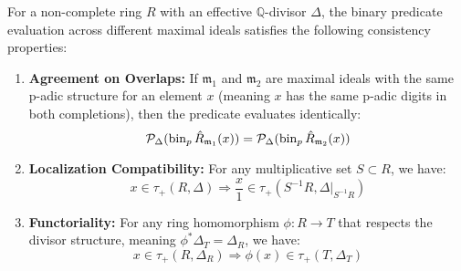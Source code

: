 \begin{theorem}\label{thm:predicate-consistency}
For a non-complete ring $R$ with an effective $\mathbb{Q}$-divisor $\Delta$, the binary predicate evaluation across different maximal ideals satisfies the following consistency properties:

\begin{enumerate}
    \item \textbf{Agreement on Overlaps:} If $\mathfrak{m}_1$ and $\mathfrak{m}_2$ are maximal ideals with the same p-adic structure for an element $x$ (meaning $x$ has the same p-adic digits in both completions), then the predicate evaluates identically: 
    $$\mathcal{P}_\Delta(\operatorname{bin}_p{\hat{R}_{\mathfrak{m}_1}}(x)) = \mathcal{P}_\Delta(\operatorname{bin}_p{\hat{R}_{\mathfrak{m}_2}}(x))$$
    
    \item \textbf{Localization Compatibility:} For any multiplicative set $S \subset R$, we have:
    $$x \in \tau_+(R, \Delta) \Rightarrow \frac{x}{1} \in \tau_+(S^{-1}R, \Delta|_{S^{-1}R})$$
    
    \item \textbf{Functoriality:} For any ring homomorphism $\phi: R \to T$ that respects the divisor structure, meaning $\phi^*\Delta_T = \Delta_R$, we have:
    $$x \in \tau_+(R, \Delta_R) \Rightarrow \phi(x) \in \tau_+(T, \Delta_T)$$
\end{enumerate}
\end{theorem}

